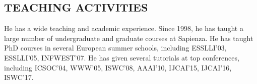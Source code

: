 \subsection*{TEACHING ACTIVITIES}
\vspace{-2ex}
He has a wide teaching and academic experience. Since 1998, he has taught a large number of undergraduate and graduate courses at Sapienza.  
He has taught PhD courses in several European summer schools, including 
ESSLLI'03, %
ESSLLI'05, %
INFWEST'07. %
He has given several tutorials at top conferences, including 
ICSOC'04,
WWW'05, %
ISWC'08, %
AAAI'10, %
IJCAI'15, %
IJCAI'16, %
ISWC'17.


